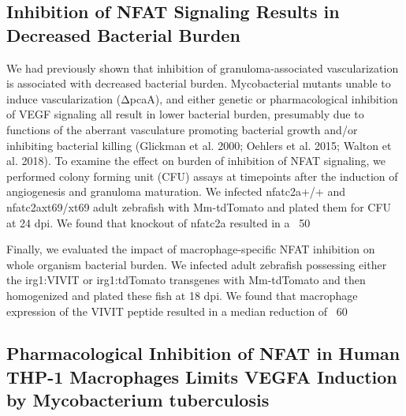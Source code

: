 \subsection{Inhibition of NFAT Signaling Results in Decreased Bacterial Burden}

We had previously shown that inhibition of granuloma-associated vascularization is associated with decreased bacterial burden. Mycobacterial mutants unable to induce vascularization (ΔpcaA), and either genetic or pharmacological inhibition of VEGF signaling all result in lower bacterial burden, presumably due to functions of the aberrant vasculature promoting bacterial growth and/or inhibiting bacterial killing (Glickman et al. 2000; Oehlers et al. 2015; Walton et al. 2018). To examine the effect on burden of inhibition of NFAT signaling, we performed colony forming unit (CFU) assays at timepoints after the induction of angiogenesis and granuloma maturation. We infected nfatc2a+/+ and nfatc2axt69/xt69 adult zebrafish with Mm-tdTomato and plated them for CFU at 24 dpi. We found that knockout of nfatc2a resulted in a ~50%

Finally, we evaluated the impact of macrophage-specific NFAT inhibition on whole organism bacterial burden. We infected adult zebrafish possessing either the irg1:VIVIT or irg1:tdTomato transgenes with Mm-tdTomato and then homogenized and plated these fish at 18 dpi. We found that macrophage expression of the VIVIT peptide resulted in a median reduction of ~60%
 
\subsection{Pharmacological Inhibition of NFAT in Human THP-1 Macrophages Limits VEGFA Induction by Mycobacterium tuberculosis}

